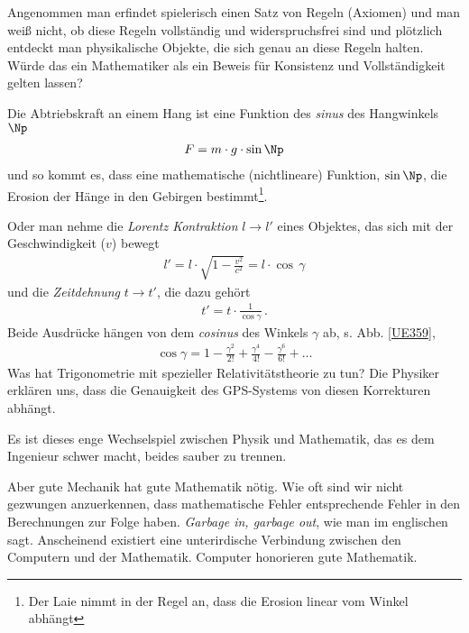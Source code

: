 Angenommen man erfindet spielerisch einen Satz von Regeln (Axiomen) und man wei{\ss} nicht, ob diese Regeln vollst\"{a}ndig und widerspruchsfrei sind und pl\"{o}tzlich entdeckt man physikalische Objekte, die sich genau an diese Regeln halten. W\"{u}rde das ein Mathematiker als ein Beweis f\"{u}r Konsistenz und Vollst\"{a}ndigkeit gelten lassen?

Die Abtriebskraft an einem Hang ist eine Funktion des {\em sinus\/} des Hangwinkels $\Np$
\begin{align}
F = m \cdot g \cdot \sin \Np
\end{align}
und so kommt es, dass eine mathematische (nichtlineare) Funktion, $\sin \Np$, die Erosion der H\"{a}nge in den Gebirgen bestimmt\footnote{Der Laie nimmt in der Regel an, dass die Erosion linear vom Winkel abh\"{a}ngt}.

Oder man nehme die {\em Lorentz Kontraktion\/} $l \to l'$ eines Objektes, das sich mit der Geschwindigkeit ($v$) bewegt
\begin{align}
l' = l \cdot \sqrt{1 - \frac{v^2}{c^2}} = l \cdot \cos\,\gamma
\end{align}
und die {\em Zeitdehnung\/} $t \to t'$, die dazu geh\"{o}rt
\begin{align}
t' = t \cdot \frac{1}{\cos \gamma}\,.
\end{align}
Beide Ausdr\"{u}cke h\"{a}ngen von dem {\em cosinus\/} des Winkels $\gamma$ ab, s. Abb. \ref{UE359},
\begin{align}
\cos \gamma = 1 - \frac{\gamma^2}{2!} + \frac{\gamma^4}{4!} - \frac{\gamma^6}{6!} + \ldots
\end{align}
Was hat Trigonometrie mit spezieller Relativit\"{a}tstheorie zu tun? Die Physiker erkl\"{a}ren uns, dass die Genauigkeit des GPS-Systems von diesen Korrekturen abh\"{a}ngt.

Es ist dieses enge Wechselspiel zwischen Physik und Mathematik, das es dem Ingenieur schwer macht, beides sauber zu trennen.


Aber gute Mechanik hat gute Mathematik n\"{o}tig. Wie oft sind wir nicht gezwungen anzuerkennen, dass mathematische Fehler entsprechende Fehler in den Berechnungen zur Folge haben. {\em Garbage in, garbage out\/}, wie man im englischen sagt. Anscheinend existiert eine unterirdische Verbindung zwischen den Computern und der Mathematik. Computer honorieren gute Mathematik.

